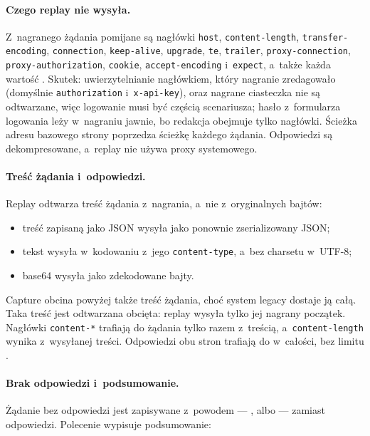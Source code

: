 \paragraph{Czego replay nie wysyła.} Z~nagranego żądania pomijane są nagłówki
\texttt{host}, \texttt{content-length}, \texttt{transfer-encoding}, \texttt{connection},
\texttt{keep-alive}, \texttt{upgrade}, \texttt{te}, \texttt{trailer},
\texttt{proxy-connection}, \texttt{proxy-authorization}, \texttt{cookie},
\texttt{accept-encoding} i~\texttt{expect}, a~także każda wartość .
Skutek: uwierzytelnianie nagłówkiem, który nagranie zredagowało (domyślnie
\texttt{authorization} i~\texttt{x-api-key}), oraz nagrane ciasteczka nie są odtwarzane, więc
logowanie musi być częścią scenariusza; hasło z~formularza logowania leży w~nagraniu jawnie,
bo redakcja obejmuje tylko nagłówki. Ścieżka adresu bazowego strony poprzedza ścieżkę każdego żądania. Odpowiedzi są
dekompresowane, a~replay nie używa proxy systemowego.

\paragraph{Treść żądania i~odpowiedzi.} Replay odtwarza treść żądania z~nagrania, a~nie
z~oryginalnych bajtów:
\begin{itemize}
  \item treść zapisaną jako JSON wysyła jako ponownie zserializowany JSON;
  \item tekst wysyła w~kodowaniu z~jego \texttt{content-type}, a~bez charsetu w~UTF-8;
  \item base64 wysyła jako zdekodowane bajty.
\end{itemize}
Capture obcina powyżej  także treść żądania, choć system legacy
dostaje ją całą. Taka treść jest odtwarzana obcięta: replay wysyła tylko jej nagrany
początek. Nagłówki \texttt{content-*} trafiają do żądania tylko razem z~treścią,
a~\texttt{content-length} wynika z~wysyłanej treści. Odpowiedzi obu stron trafiają do
 w~całości, bez limitu .

\paragraph{Brak odpowiedzi i~podsumowanie.} Żądanie bez odpowiedzi jest zapisywane z~powodem --- ,  albo  --- zamiast
odpowiedzi. Polecenie wypisuje podsumowanie:

